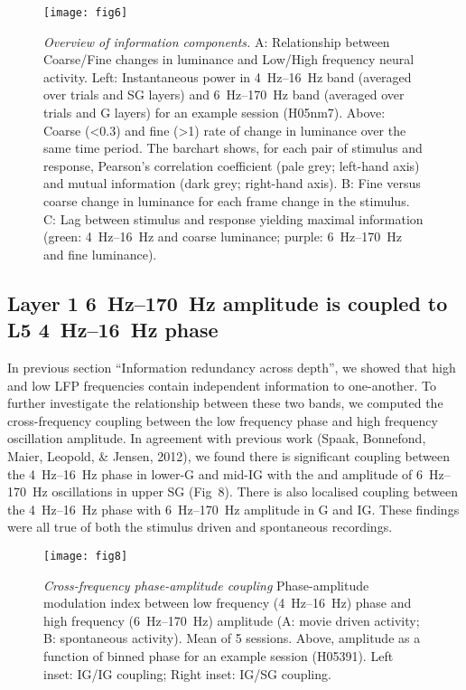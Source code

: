 \begin{figure}[htbp]
\centering \texttt{[image: fig6]}
%
\caption{%
\textit{Overview of information components.}
A: Relationship between Coarse/Fine changes in luminance and Low/High frequency neural activity.
Left: Instantaneous power in \SIrange{4}{16}{Hz} band (averaged over trials and \ac{SG} layers) and \SIrange{6}{170}{Hz} band (averaged over trials and \ac{G} layers) for an example session (H05nm7).
Above: Coarse (\SI{<0.3}{\cpd}) and fine (\SI{>1}{\cpd}) rate of change in luminance over the same time period.
The barchart shows, for each pair of stimulus and response, Pearson's correlation coefficient (pale grey; left-hand axis) and mutual information (dark grey; right-hand axis).
B: Fine versus coarse change in luminance for each frame change in the stimulus.
C: Lag between stimulus and response yielding maximal information (green: \SIrange{4}{16}{Hz} and coarse luminance; purple: \SIrange{6}{170}{Hz} and fine luminance).}%
\label{fig:lam_6}
%
\end{figure}

\subsection{Layer 1 \SIrange{6}{170}{Hz} amplitude is coupled to \ac{L5} \SIrange{4}{16}{Hz} phase}
In previous section ``Information redundancy across depth'', we showed that high and low \ac{LFP} frequencies contain independent information to one-another.
To further investigate the relationship between these two bands, we computed the cross-frequency coupling between the low frequency phase and high frequency oscillation amplitude.
In agreement with previous work (Spaak, Bonnefond, Maier, Leopold, \& Jensen, 2012), we found there is significant coupling between the \SIrange{4}{16}{Hz} phase in lower-\ac{G} and mid-\ac{IG} with the and amplitude of \SIrange{6}{170}{Hz} oscillations in upper \ac{SG} (Fig~8).
There is also localised coupling between the \SIrange{4}{16}{Hz} phase with \SIrange{6}{170}{Hz} amplitude in \ac{G} and \ac{IG}.
These findings were all true of both the stimulus driven and spontaneous recordings.

\begin{figure}[htbp]
\centering \texttt{[image: fig8]}
%
\caption{%
\textit{Cross-frequency phase-amplitude coupling}
Phase-amplitude modulation index between low frequency (\SIrange{4}{16}{Hz}) phase and high 
frequency (\SIrange{6}{170}{Hz}) amplitude (A: movie driven activity; B: spontaneous 
activity).
Mean of 5 sessions.
Above, amplitude as a function of binned phase for an example session (H05391).
Left inset: \ac{IG}/\ac{IG} coupling; Right inset: \ac{IG}/\ac{SG} coupling.}%
\label{fig:lam_8}
%
\end{figure}

